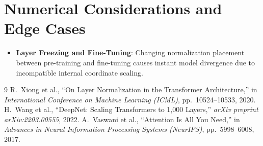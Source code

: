 \documentclass[11pt,a4paper]{article}
\theoremstyle{definition}
\begin{document}
\section{Numerical Considerations and Edge Cases}

\begin{itemize}
    \item \textbf{Layer Freezing and Fine-Tuning}: Changing normalization placement between pre-training and fine-tuning causes instant model divergence due to incompatible internal coordinate scaling.
\end{itemize}

\begin{thebibliography}{9}
 R.~Xiong et al., ``On Layer Normalization in the Transformer Architecture,'' in \emph{International Conference on Machine Learning (ICML)}, pp.~10524--10533, 2020.
 H.~Wang et al., ``DeepNet: Scaling Transformers to 1,000 Layers,'' \emph{arXiv preprint arXiv:2203.00555}, 2022.
 A.~Vaswani et al., ``Attention Is All You Need,'' in \emph{Advances in Neural Information Processing Systems (NeurIPS)}, pp.~5998--6008, 2017.
\end{thebibliography}
\end{document}

